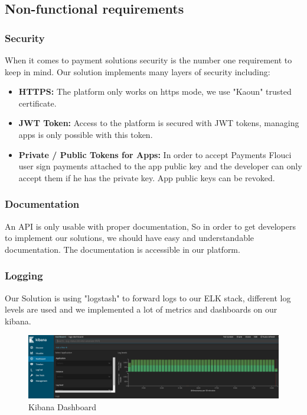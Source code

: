 \begin{spacing}{1.2}
\subsection{Non-functional requirements}
\subsubsection{Security}
When it comes to payment solutions security is the number one requirement to keep in mind.
Our solution implements many layers of security including: 
\begin{itemize}
	\item \textbf{HTTPS:} The platform only works on https mode, we use "Kaoun" trusted certificate.
	\item \textbf{JWT Token\cite{JWT}:}  Access to the platform is secured with JWT tokens, managing apps is only possible with this token.
	\item \textbf{Private / Public Tokens for Apps:}  In order to accept Payments Flouci user sign payments attached to the app public key and the developer can only accept them if he has the private key.
	App public keys can be revoked.
\end{itemize}
\subsubsection{Documentation}
An API is only usable with proper documentation, So in order to get developers to implement our solutions, we should have easy and understandable documentation. The documentation is accessible in our platform.\subsubsection{Logging}
Our Solution is using "logstash" to forward logs to our ELK\cite{ELK} stack, different log levels are used and we implemented a lot of metrics and dashboards on our kibana.

\begin{figure}[H]\centering
\includegraphics[scale=0.3]{ELK.png}
\caption{Kibana Dashboard}
\label{fig:usecasediagram}
\end{figure}


\end{spacing}
